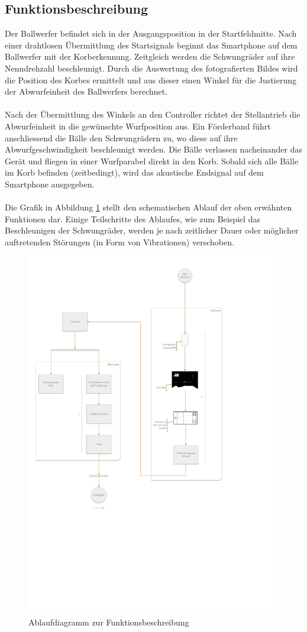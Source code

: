 \subsection{Funktionsbeschreibung}
Der Ballwerfer befindet sich in der Ausgangsposition in der Startfeldmitte. 
Nach einer drahtlosen Übermittlung des Startsignals beginnt das Smartphone auf 
dem Ballwerfer mit der Korberkennung. Zeitgleich werden die Schwungräder auf 
ihre Nenndrehzahl beschleunigt. Durch die Auswertung des fotografierten Bildes 
wird die Position des Korbes ermittelt und aus dieser einen Winkel für die 
Justierung der Abwurfeinheit des Ballwerfers berechnet.\\
\\
Nach der Übermittlung des Winkels an den Controller richtet der Stellantrieb 
die Abwurfeinheit in die gewünschte Wurfposition aus. Ein Förderband führt 
anschliessend die Bälle den Schwungrädern zu, wo diese auf ihre 
Abwurfgeschwindigkeit beschleunigt werden. Die Bälle verlassen nacheinander 
das Gerät und fliegen in einer Wurfparabel direkt in den Korb. Sobald sich 
alle Bälle im Korb befinden (zeitbedingt), wird das akustische Endsignal 
auf dem Smartphone ausgegeben.\\
\\
Die Grafik in Abbildung \ref{fig:FlowChart} stellt den 
schematischen Ablauf der oben erwähnten Funktionen dar. Einige Teilschritte 
des Ablaufes, wie zum Beispiel das Beschleunigen der Schwungräder, werden 
je nach zeitlicher Dauer oder möglicher auftretenden Störungen (in Form von 
Vibrationen) verschoben.
%
\begin{figure}[h!]
	\centering
	\includegraphics[width=1\textwidth,clip,trim=10mm 169mm 89mm 15mm]
	{Enddokumentation/Loesungskonzept/Bilder/FlowOnChart_v3.pdf}
	\caption{Ablaufdiagramm zur Funktionsbeschreibung}
	\label{fig:FlowChart}
\end{figure}
\clearpage
